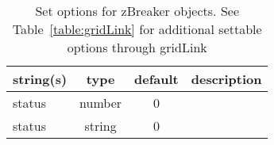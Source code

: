 \begin{table}[ht]
\centering
\begin{tabular}{p{5cm} c c p{7cm}}
\hline
string(s) & type & default & description \\
\hline
status & number & 0 & \\
status & string & 0 & \\
\hline
\end{tabular}
\caption{Set options for zBreaker objects. See Table~\ref{table:gridLink} for additional settable options through gridLink}
\label{table:zBreaker}
\end{table}
